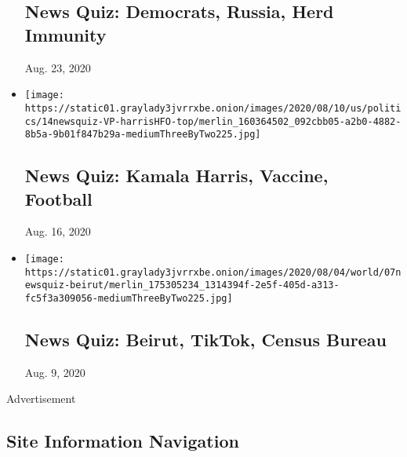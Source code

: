 \begin{itemize}
  \hypertarget{news-quiz-democrats-russia-herd-immunity}{%
  \subsection{News Quiz: Democrats, Russia, Herd
  Immunity}\label{news-quiz-democrats-russia-herd-immunity}}

  Aug. 23, 2020
\item
  \href{https://www.nytimes3xbfgragh.onion/interactive/2020/08/14/briefing/kamala-harris-vaccine-football-news-quiz.html}{}

  \texttt{[image: https://static01.graylady3jvrrxbe.onion/images/2020/08/10/us/politics/14newsquiz-VP-harrisHFO-top/merlin\_160364502\_092cbb05-a2b0-4882-8b5a-9b01f847b29a-mediumThreeByTwo225.jpg]}

  \hypertarget{news-quiz-kamala-harris-vaccine-football}{%
  \subsection{News Quiz: Kamala Harris, Vaccine,
  Football}\label{news-quiz-kamala-harris-vaccine-football}}

  Aug. 16, 2020
\item
  \href{https://www.nytimes3xbfgragh.onion/interactive/2020/08/07/briefing/beirut-tiktok-census-bureau-news-quiz.html}{}

  \texttt{[image: https://static01.graylady3jvrrxbe.onion/images/2020/08/04/world/07newsquiz-beirut/merlin\_175305234\_1314394f-2e5f-405d-a313-fc5f3a309056-mediumThreeByTwo225.jpg]}

  \hypertarget{news-quiz-beirut-tiktok-census-bureau}{%
  \subsection{News Quiz: Beirut, TikTok, Census
  Bureau}\label{news-quiz-beirut-tiktok-census-bureau}}

  Aug. 9, 2020
\end{itemize}

Advertisement

\hypertarget{site-information-navigation}{%
\subsection{Site Information
Navigation}\label{site-information-navigation}}

